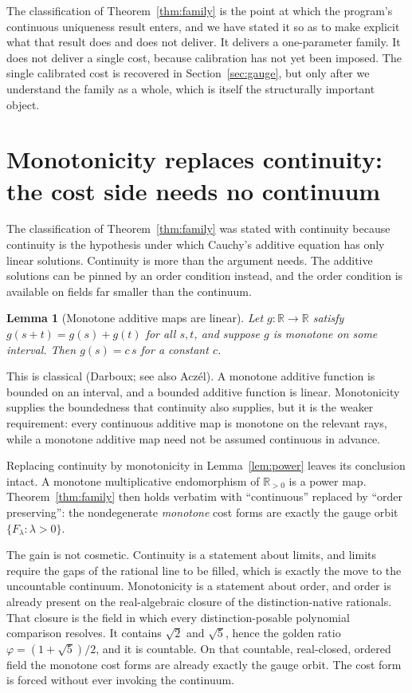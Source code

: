 \documentclass[11pt,a4paper]{article}
\newtheorem{lemma}[theorem]{Lemma}
\theoremstyle{definition}
\theoremstyle{remark}
\newcommand{\Rpos}{\mathbb{R}_{>0}}
\newcommand{\costL}[1]{F_{#1}}
\begin{document}
The classification of Theorem~\ref{thm:family} is the point at which the program's
continuous uniqueness result enters, and we have stated it so as to make explicit
what that result does and does not deliver. It delivers a one-parameter family. It
does not deliver a single cost, because calibration has not yet been imposed. The
single calibrated cost is recovered in Section~\ref{sec:gauge}, but only after we
understand the family as a whole, which is itself the structurally important
object.

\section{Monotonicity replaces continuity: the cost side needs no continuum}\label{sec:monotone}

The classification of Theorem~\ref{thm:family} was stated with continuity because
continuity is the hypothesis under which Cauchy's additive equation has only
linear solutions. Continuity is more than the argument needs. The additive
solutions can be pinned by an order condition instead, and the order condition is
available on fields far smaller than the continuum.

\begin{lemma}[Monotone additive maps are linear]\label{lem:monotone-additive}
Let $g \colon \mathbb{R} \to \mathbb{R}$ satisfy $g(s+t) = g(s) + g(t)$ for all
$s, t$, and suppose $g$ is monotone on some interval. Then $g(s) = c\,s$ for a
constant $c$.
\end{lemma}

This is classical (Darboux; see also Acz\'el). A monotone additive function is
bounded on an interval, and a bounded additive function is linear. Monotonicity
supplies the boundedness that continuity also supplies, but it is the weaker
requirement: every continuous additive map is monotone on the relevant rays,
while a monotone additive map need not be assumed continuous in advance.

Replacing continuity by monotonicity in Lemma~\ref{lem:power} leaves its
conclusion intact. A monotone multiplicative endomorphism of $\Rpos$ is a power
map. Theorem~\ref{thm:family} then holds verbatim with ``continuous'' replaced by
``order preserving'': the nondegenerate \emph{monotone} cost forms are exactly the
gauge orbit $\{\costL{\lambda} : \lambda > 0\}$.

The gain is not cosmetic. Continuity is a statement about limits, and limits
require the gaps of the rational line to be filled, which is exactly the move to
the uncountable continuum. Monotonicity is a statement about order, and order is
already present on the real-algebraic closure of the distinction-native rationals.
That closure is the field in which every distinction-posable polynomial comparison
resolves. It contains $\sqrt{2}$ and $\sqrt{5}$, hence the golden ratio
$\varphi = (1 + \sqrt{5})/2$, and it is countable. On that countable, real-closed,
ordered field the monotone cost forms are already exactly the gauge orbit. The
cost form is forced without ever invoking the continuum.
\end{document}

